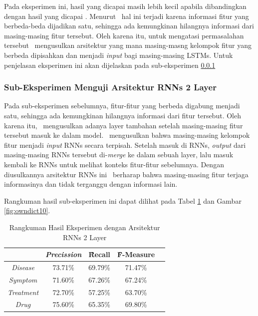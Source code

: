     Pada eksperimen ini, hasil yang dicapai masih lebih kecil apabila dibandingkan dengan hasil yang dicapai \cite{skripsiKakRadit}. Menurut \saya~hal ini terjadi karena informasi fitur yang berbeda-beda dijadikan satu, sehingga ada kemungkinan hilangnya informasi dari masing-masing fitur tersebut. Oleh karena itu, untuk mengatasi permasalahan tersebut \saya~mengusulkan arsitektur yang mana masing-masng kelompok fitur yang berbeda dipisahkan dan menjadi \textit{input} bagi masing-masing LSTMs. Untuk penjelasan eksperimen ini akan dijelaskan pada sub-eksperimen \ref{eks2:subeksrnn2}
    
    
    \subsubsection{Sub-Eksperimen Menguji Arsitektur RNNs 2 Layer}\label{eks2:subeksrnn2}
    Pada sub-eksperimen sebelumnya, fitur-fitur yang berbeda digabung menjadi satu, sehingga ada kemungkinan hilangnya informasi dari fitur tersebut. Oleh karena itu, \saya~mengusulkan adanya layer tambahan setelah masing-masing fitur tersebut masuk ke dalam model. \Saya~mengusulkan bahwa masing-masing kelompok fitur menjadi \textit{input} RNNs secara terpisah. Setelah masuk di RNNs, \textit{output} dari masing-masing RNNs tersebut di-\textit{merge} ke dalam sebuah layer, lalu masuk kembali ke RNNs untuk melihat konteks fitur-fitur sebelumnya. Dengan diusulkannya arsitektur RNNs ini \saya~berharap bahwa masing-masing fitur terjaga informasinya dan tidak terganggu dengan informasi lain.
    
    Rangkuman hasil sub-eksperimen ini dapat dilihat pada Tabel \ref{table:owndict10} dan Gambar \ref{fig:owndict10}.
    
    \begin{table}
    	\centering
    	\caption{Rangkuman Hasil Eksperimen dengan Arsitektur RNNs 2 Layer}
    	\begin{tabular}{|c|c|c|c|c|}
    		\hline
    		& \textit{Precission} & \f{\f{Recall}} & \f{\f{F-Measure}} \\ \hline
    		\textit{Disease}      & 73.71\%             & 69.79\%        & 71.47\%           \\ \hline
    		\textit{Symptom}      & 71.60\%             & 67.26\%        & 67.24\%           \\ \hline
    		\textit{Treatment}    & 72.70\%             & 57.25\%        & 63.70\%           \\ \hline
    		\textit{Drug}		  & 75.60\%             & 65.35\%        & 69.80\%           \\ \hline
    	\end{tabular}
    	\label{table:owndict10}
    \end{table}
    
